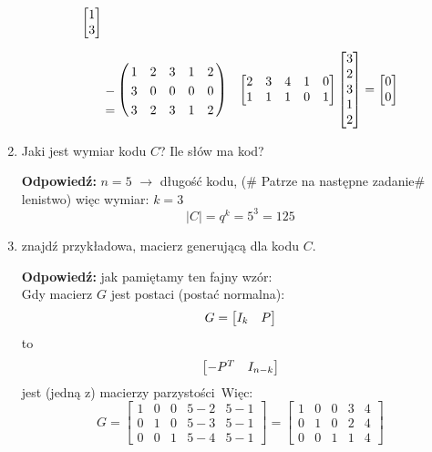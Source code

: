 \documentclass[a4paper,12pt]{article}
\theoremstyle{definition}%
\theoremstyle{definition}
\theoremstyle{problem}
\let\bbordermatrix\bordermatrix
\begin{document}
\begin{enumerate}[label=\alph*)]
\begin{align*}
\begin{bmatrix}
1\\3
\end{bmatrix}\\
&\bbordermatrix{
&&&&&\cr
&1&2&3&1&2\cr
-&3&0&0&0&0\cr
=&3&2&3&1&2
}&\begin{bmatrix}
2& 3& 4& 1& 0\\
1& 1& 1& 0& 1 
\end{bmatrix}\begin{bmatrix}
3\\ 2\\ 3\\ 1\\ 2
\end{bmatrix}=\begin{bmatrix}
0\\0
\end{bmatrix}
\end{align*}
\item Jaki jest wymiar kodu $C$? Ile słów ma kod?

\textbf{Odpowiedź: }$n=5$ $\rightarrow$ długość kodu, (\# Patrze na następne zadanie\# lenistwo) więc wymiar: $k=3$
$$|C|=q^k=5^3=125$$
\item znajdź przykładowa, macierz generującą dla kodu $C$.

\textbf{Odpowiedź:} jak pamiętamy ten fajny wzór:\\
Gdy macierz $G$ jest postaci (postać normalna):
$$G=\begin{bmatrix}
{\Huge I_k}& {\Huge P}
\end{bmatrix}$$
to
$$\begin{bmatrix}
{\Huge -P^T} & {\Huge I_{n-k}}
\end{bmatrix}$$ jest (jedną z) macierzy parzystości\
Więc: $$G=\begin{bmatrix}
1 & 0 & 0 & 5-2 & 5-1\\
0 & 1 & 0 & 5-3 & 5-1\\
0 & 0 & 1 & 5-4 & 5-1
\end{bmatrix}=\begin{bmatrix}
1 & 0 & 0 & 3 & 4\\
0 & 1 & 0 & 2 & 4\\
0 & 0 & 1 & 1 & 4
\end{bmatrix}$$
\end{enumerate}
\end{document}
